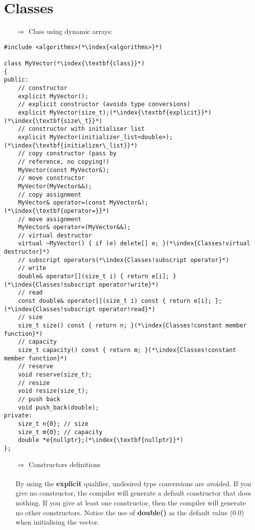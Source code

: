 \documentclass[10pt]{article}
\begin{document}
\section{Classes}
\small
\begin{enumerate}
\item[$\Rightarrow$] Class using dynamic arrays:
\end{enumerate}
\begin{lstlisting}
#include <algorithms>(*\index{<algorithms>}*)

class MyVector(*\index{\textbf{class}}*)
{
public:
    // constructor
    explicit MyVector();
    // explicit constructor (avoids type conversions)
    explicit MyVector(size_t);(*\index{\textbf{explicit}}*)(*\index{\textbf{size\_t}}*)
    // constructor with initialiser list
    explicit MyVector(initializer_list<double>);(*\index{\textbf{initializer\_list}}*)
    // copy constructor (pass by
    // reference, no copying!)
    MyVector(const MyVector&);
    // move constructor
    MyVector(MyVector&&);
    // copy assignment
    MyVector& operator=(const MyVector&);(*\index{\textbf{operator=}}*)
    // move assignment
    MyVector& operator=(MyVector&&);
    // virtual destructor
    virtual ~MyVector() { if (e) delete[] e; }(*\index{Classes!virtual destructor}*)
    // subscript operators(*\index{Classes!subscript operator}*)
    // write
    double& operator[](size_t i) { return e[i]; }(*\index{Classes!subscript operator!write}*)
    // read
    const double& operator[](size_t i) const { return e[i]; };(*\index{Classes!subscript operator!read}*)
    // size
    size_t size() const { return n; }(*\index{Classes!constant member function}*)
    // capacity
    size_t capacity() const { return m; }(*\index{Classes!constant member function}*)
    // reserve
    void reserve(size_t);
    // resize
    void resize(size_t);
    // push back
    void push_back(double);
private:
    size_t n{0}; // size
    size_t m{0}; // capacity
    double *e{nullptr};(*\index{\textbf{nullptr}}*)
};
\end{lstlisting}
\begin{enumerate}
\item[$\Rightarrow$] Constructors definitions\\ \\ By using the \textbf{explicit} qualifier, undesired type conversions are avoided. If you give no constructor, the compiler will generate a default constructor that does nothing.
If you give at least one constructor, then the compiler will generate no other constructors. Notice the use of \textbf{double()} as the default value (0.0)
when initialising the vector.
\end{enumerate}
\end{document}

